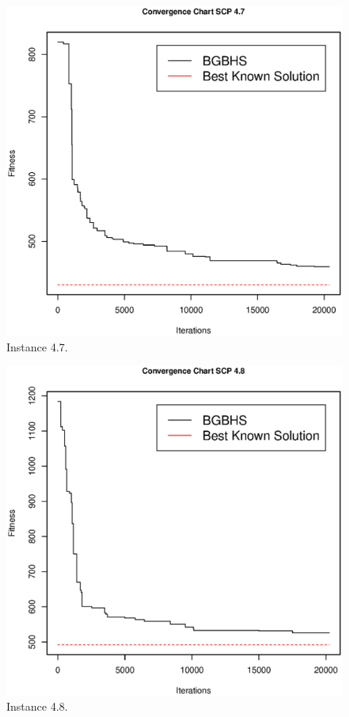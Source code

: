 \begin{figure}[]
\centering
\includegraphics[scale=.45]{Resultados/scp47.eps}
\caption{Instance 4.7.}
\label{fig:Instance.4.7}
\end{figure}

\begin{figure}[]
\centering
\includegraphics[scale=.45]{Resultados/scp48.eps}
\caption{Instance 4.8.}
\label{fig:Instance.4.8}
\end{figure}

